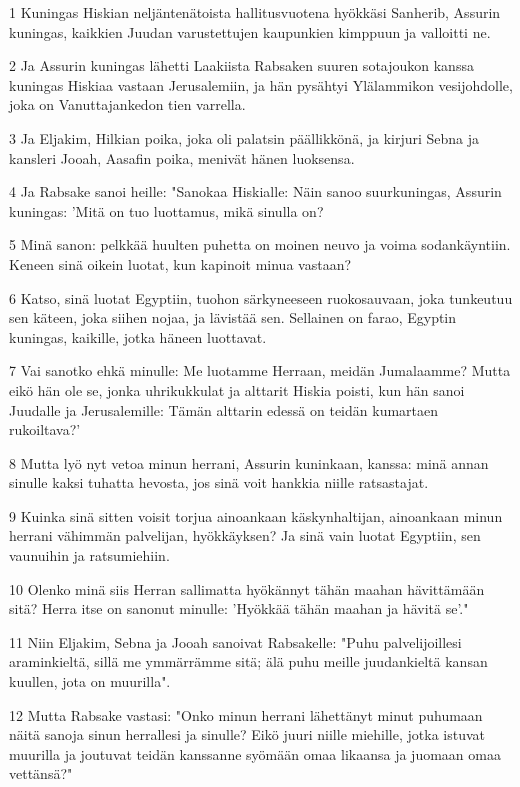 \par 1 Kuningas Hiskian neljäntenätoista hallitusvuotena hyökkäsi Sanherib, Assurin kuningas, kaikkien Juudan varustettujen kaupunkien kimppuun ja valloitti ne.
\par 2 Ja Assurin kuningas lähetti Laakiista Rabsaken suuren sotajoukon kanssa kuningas Hiskiaa vastaan Jerusalemiin, ja hän pysähtyi Ylälammikon vesijohdolle, joka on Vanuttajankedon tien varrella.
\par 3 Ja Eljakim, Hilkian poika, joka oli palatsin päällikkönä, ja kirjuri Sebna ja kansleri Jooah, Aasafin poika, menivät hänen luoksensa.
\par 4 Ja Rabsake sanoi heille: "Sanokaa Hiskialle: Näin sanoo suurkuningas, Assurin kuningas: 'Mitä on tuo luottamus, mikä sinulla on?
\par 5 Minä sanon: pelkkää huulten puhetta on moinen neuvo ja voima sodankäyntiin. Keneen sinä oikein luotat, kun kapinoit minua vastaan?
\par 6 Katso, sinä luotat Egyptiin, tuohon särkyneeseen ruokosauvaan, joka tunkeutuu sen käteen, joka siihen nojaa, ja lävistää sen. Sellainen on farao, Egyptin kuningas, kaikille, jotka häneen luottavat.
\par 7 Vai sanotko ehkä minulle: Me luotamme Herraan, meidän Jumalaamme? Mutta eikö hän ole se, jonka uhrikukkulat ja alttarit Hiskia poisti, kun hän sanoi Juudalle ja Jerusalemille: Tämän alttarin edessä on teidän kumartaen rukoiltava?'
\par 8 Mutta lyö nyt vetoa minun herrani, Assurin kuninkaan, kanssa: minä annan sinulle kaksi tuhatta hevosta, jos sinä voit hankkia niille ratsastajat.
\par 9 Kuinka sinä sitten voisit torjua ainoankaan käskynhaltijan, ainoankaan minun herrani vähimmän palvelijan, hyökkäyksen? Ja sinä vain luotat Egyptiin, sen vaunuihin ja ratsumiehiin.
\par 10 Olenko minä siis Herran sallimatta hyökännyt tähän maahan hävittämään sitä? Herra itse on sanonut minulle: 'Hyökkää tähän maahan ja hävitä se'."
\par 11 Niin Eljakim, Sebna ja Jooah sanoivat Rabsakelle: "Puhu palvelijoillesi araminkieltä, sillä me ymmärrämme sitä; älä puhu meille juudankieltä kansan kuullen, jota on muurilla".
\par 12 Mutta Rabsake vastasi: "Onko minun herrani lähettänyt minut puhumaan näitä sanoja sinun herrallesi ja sinulle? Eikö juuri niille miehille, jotka istuvat muurilla ja joutuvat teidän kanssanne syömään omaa likaansa ja juomaan omaa vettänsä?"
